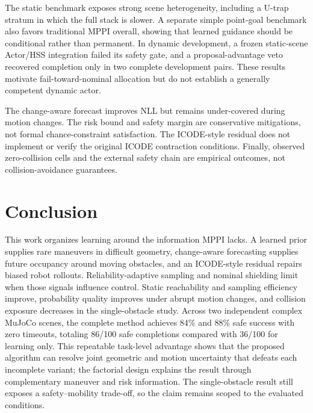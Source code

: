 \documentclass[conference]{IEEEtran}
\begin{document}
The static benchmark exposes strong scene heterogeneity, including a U-trap stratum in which the full stack is slower. A separate simple point-goal benchmark also favors traditional MPPI overall, showing that learned guidance should be conditional rather than permanent. In dynamic development, a frozen static-scene Actor/HSS integration failed its safety gate, and a proposal-advantage veto recovered completion only in two complete development pairs. These results motivate fail-toward-nominal allocation but do not establish a generally competent dynamic actor.

The change-aware forecast improves NLL but remains under-covered during motion changes. The risk bound and safety margin are conservative mitigations, not formal chance-constraint satisfaction. The ICODE-style residual does not implement or verify the original ICODE contraction conditions. Finally, observed zero-collision cells and the external safety chain are empirical outcomes, not collision-avoidance guarantees.

\section{Conclusion}
\label{sec:conclusion}

This work organizes learning around the information MPPI lacks. A learned prior supplies rare maneuvers in difficult geometry, change-aware forecasting supplies future occupancy around moving obstacles, and an ICODE-style residual repairs biased robot rollouts. Reliability-adaptive sampling and nominal shielding limit when those signals influence control. Static reachability and sampling efficiency improve, probability quality improves under abrupt motion changes, and collision exposure decreases in the single-obstacle study. Across two independent complex MuJoCo scenes, the complete method achieves 84\% and 88\% safe success with zero timeouts, totaling 86/100 safe completions compared with 36/100 for learning only. This repeatable task-level advantage shows that the proposed algorithm can resolve joint geometric and motion uncertainty that defeats each incomplete variant; the factorial design explains the result through complementary maneuver and risk information. The single-obstacle result still exposes a safety--mobility trade-off, so the claim remains scoped to the evaluated conditions. 

\balance


\end{document}
